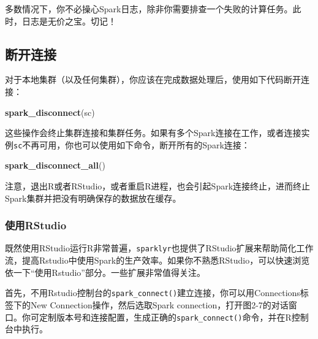 \documentclass[
]{article}
\newenvironment{Shaded}{\begin{snugshade}}{\end{snugshade}}
\newcommand{\KeywordTok}[1]{\textcolor[rgb]{0.13,0.29,0.53}{\textbf{#1}}}
\newcommand{\NormalTok}[1]{#1}
\begin{document}
多数情况下，你不必操心Spark日志，除非你需要排查一个失败的计算任务。此时，日志是无价之宝。切记！

\hypertarget{ux65adux5f00ux8fdeux63a5}{%
\subsection{断开连接}\label{ux65adux5f00ux8fdeux63a5}}

对于本地集群（以及任何集群），你应该在完成数据处理后，使用如下代码断开连接：

\begin{Shaded}
\begin{Highlighting}[]
\KeywordTok{spark_disconnect}\NormalTok{(sc)}
\end{Highlighting}
\end{Shaded}

这些操作会终止集群连接和集群任务。如果有多个Spark连接在工作，或者连接实例\texttt{sc}不再可用，你也可以使用如下命令，断开所有的Spark连接：

\begin{Shaded}
\begin{Highlighting}[]
\KeywordTok{spark_disconnect_all}\NormalTok{()}
\end{Highlighting}
\end{Shaded}

注意，退出R或者RStudio，或者重启R进程，也会引起Spark连接终止，进而终止Spark集群并把没有明确保存的数据放在缓存。

\hypertarget{ux4f7fux7528rstudio}{%
\subsubsection{使用RStudio}\label{ux4f7fux7528rstudio}}

既然使用RStudio运行R非常普遍，\texttt{sparklyr}也提供了RStudio扩展来帮助简化工作流，提高Rstudio中使用Spark的生产效率。如果你不熟悉RStudio，可以快速浏览依一下``使用Rstudio''部分。一些扩展非常值得关注。

首先，不用Rstudio控制台的\texttt{spark\_connect()}建立连接，你可以用Connections标签下的New
Connection操作，然后选取Spark
connection，打开图2-7的对话窗口。你可定制版本号和连接配置，生成正确的\texttt{spark\_connect()}命令，并在R控制台中执行。
\end{document}
